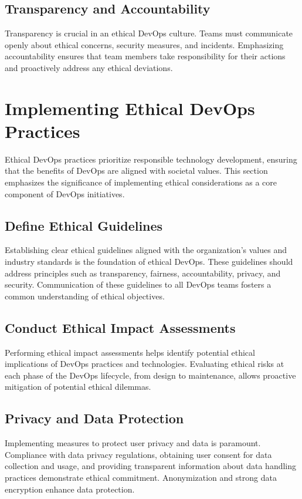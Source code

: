 \documentclass[conference]{IEEEtran}
\begin{document}
\subsection{Transparency and Accountability}
Transparency is crucial in an ethical DevOps culture. Teams must communicate openly about ethical concerns, security measures, and incidents. Emphasizing accountability ensures that team members take responsibility for their actions and proactively address any ethical deviations.

\section{Implementing Ethical DevOps Practices}

Ethical DevOps practices prioritize responsible technology development, ensuring that the benefits of DevOps are aligned with societal values. This section emphasizes the significance of implementing ethical considerations as a core component of DevOps initiatives.

\subsection{Define Ethical Guidelines}
Establishing clear ethical guidelines aligned with the organization's values and industry standards is the foundation of ethical DevOps. These guidelines should address principles such as transparency, fairness, accountability, privacy, and security. Communication of these guidelines to all DevOps teams fosters a common understanding of ethical objectives.

\subsection{Conduct Ethical Impact Assessments}
Performing ethical impact assessments helps identify potential ethical implications of DevOps practices and technologies. Evaluating ethical risks at each phase of the DevOps lifecycle, from design to maintenance, allows proactive mitigation of potential ethical dilemmas.

\subsection{Privacy and Data Protection}
Implementing measures to protect user privacy and data is paramount. Compliance with data privacy regulations, obtaining user consent for data collection and usage, and providing transparent information about data handling practices demonstrate ethical commitment. Anonymization and strong data encryption enhance data protection.
\end{document}
